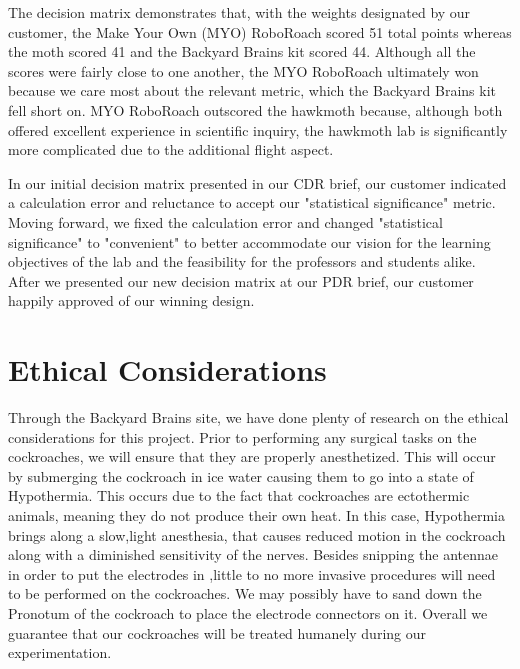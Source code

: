 \documentclass{article}
\begin{document}
\par The decision matrix demonstrates that, with the weights designated by our customer, the Make Your Own (MYO) RoboRoach scored 51 total points whereas the moth scored 41 and the Backyard Brains kit scored 44. Although all the scores were fairly close to one another, the MYO RoboRoach ultimately won because we care most about the relevant metric, which the Backyard Brains kit fell short on. MYO RoboRoach outscored the hawkmoth because, although both offered excellent experience in scientific inquiry, the hawkmoth lab is significantly more complicated due to the additional flight aspect.

\bigskip

\par In our initial decision matrix presented in our CDR brief, our customer indicated a calculation error and reluctance to accept our "statistical significance" metric. Moving forward, we fixed the calculation error and changed "statistical significance" to "convenient" to better accommodate our vision for the learning objectives of the lab and the feasibility for the professors and students alike. After we presented our new decision matrix at our PDR brief, our customer happily approved of our winning design.

\section{Ethical Considerations}
\par Through the Backyard Brains site, we have done plenty of research on the ethical considerations for this project. Prior to performing any surgical tasks on the cockroaches, we will ensure that they are properly anesthetized. This will occur by submerging the cockroach in ice water causing them to go into a state of Hypothermia. This occurs due to the fact that cockroaches are ectothermic animals, meaning they do not produce their own heat. In this case, Hypothermia brings along a slow,light anesthesia, that causes reduced motion in the cockroach along with a diminished sensitivity of the nerves. Besides snipping the antennae in order to put the electrodes in ,little to no more invasive procedures will need to be performed on the cockroaches. We may possibly have to sand down the Pronotum of the cockroach to place the electrode connectors on it. Overall we guarantee that our cockroaches will be treated humanely during our experimentation.

\bigskip
\end{document}
